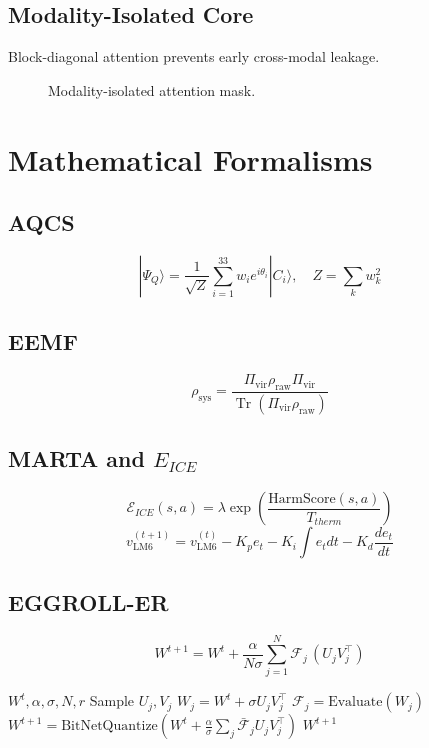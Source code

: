 \documentclass[11pt,a4paper,twocolumn]{article}
\begin{document}
\subsection{Modality-Isolated Core}
Block-diagonal attention prevents early cross-modal leakage.
\begin{figure}[htbp]
\centering
{}
\caption{Modality-isolated attention mask.}
\label{fig:mask}
\end{figure}

\section{Mathematical Formalisms}
\subsection{AQCS}
\begin{equation}
|\Psi_Q\rangle = \frac{1}{\sqrt{Z}}\sum_{i=1}^{33} w_i e^{i\theta_i}|C_i\rangle,\quad Z=\sum_k w_k^2
\end{equation}
\subsection{EEMF}
\begin{equation}
\rho_{\text{sys}} = \frac{\Pi_{\text{vir}}\rho_{\text{raw}}\Pi_{\text{vir}}}{\operatorname{Tr}(\Pi_{\text{vir}}\rho_{\text{raw}})}
\end{equation}
\subsection{MARTA and $E_{ICE}$}
\begin{equation}
\mathcal{E}_{ICE}(s,a)=\lambda\exp\!\left(\frac{\text{HarmScore}(s,a)}{T_{therm}}\right)
\end{equation}
\begin{equation}
v_{\text{LM6}}^{(t+1)} = v_{\text{LM6}}^{(t)} - K_p e_t - K_i\!\int\! e_t dt - K_d \frac{de_t}{dt}
\end{equation}
\subsection{EGGROLL-ER}
\begin{equation}
W^{t+1}=W^t+\frac{\alpha}{N\sigma}\sum_{j=1}^{N}\mathcal{F}_j\,(U_jV_j^\top)
\end{equation}
\begin{algorithm}[htbp]
\caption{EGGROLL-ER}
\begin{algorithmic}[1]
\REQUIRE $W^t,\alpha,\sigma,N,r$
\STATE Sample $U_j,V_j$
\STATE $W_j = W^t + \sigma U_jV_j^\top$
\STATE $\mathcal{F}_j = \text{Evaluate}(W_j)$
\ENDFOR
\STATE $W^{t+1}=\text{BitNetQuantize}(W^t+\frac{\alpha}{\sigma}\sum_j\bar{\mathcal{F}}_jU_jV_j^\top)$
\RETURN $W^{t+1}$
\end{algorithmic}
\end{algorithm}
\end{document}
